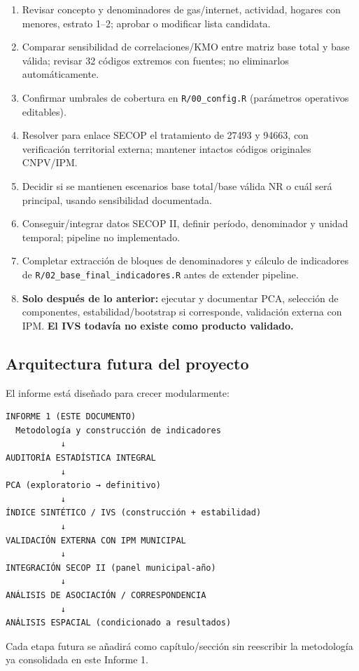 \begin{enumerate}
    \item Revisar concepto y denominadores de gas/internet, actividad, hogares con menores, estrato 1--2; aprobar o modificar lista candidata.
    \item Comparar sensibilidad de correlaciones/KMO entre matriz base total y base válida; revisar 32 códigos extremos con fuentes; no eliminarlos automáticamente.
    \item Confirmar umbrales de cobertura en \texttt{R/00\_config.R} (parámetros operativos editables).
    \item Resolver para enlace SECOP el tratamiento de 27493 y 94663, con verificación territorial externa; mantener intactos códigos originales CNPV/IPM.
    \item Decidir si se mantienen escenarios base total/base válida NR o cuál será principal, usando sensibilidad documentada.
    \item Conseguir/integrar datos SECOP II, definir período, denominador y unidad temporal; pipeline no implementado.
    \item Completar extracción de bloques de denominadores y cálculo de indicadores de \texttt{R/02\_base\_final\_indicadores.R} antes de extender pipeline.
    \item \textbf{Solo después de lo anterior:} ejecutar y documentar PCA, selección de componentes, estabilidad/bootstrap si corresponde, validación externa con IPM. \textbf{El IVS todavía no existe como producto validado.}
\end{enumerate}

\subsection{Arquitectura futura del proyecto}
\label{sec:arquitectura_futura}

El informe está diseñado para crecer modularmente:

\begin{verbatim}
INFORME 1 (ESTE DOCUMENTO)
  Metodología y construcción de indicadores
           ↓
AUDITORÍA ESTADÍSTICA INTEGRAL
           ↓
PCA (exploratorio → definitivo)
           ↓
ÍNDICE SINTÉTICO / IVS (construcción + estabilidad)
           ↓
VALIDACIÓN EXTERNA CON IPM MUNICIPAL
           ↓
INTEGRACIÓN SECOP II (panel municipal-año)
           ↓
ANÁLISIS DE ASOCIACIÓN / CORRESPONDENCIA
           ↓
ANÁLISIS ESPACIAL (condicionado a resultados)
\end{verbatim}

Cada etapa futura se añadirá como capítulo/sección sin reescribir la metodología ya consolidada en este Informe 1.

